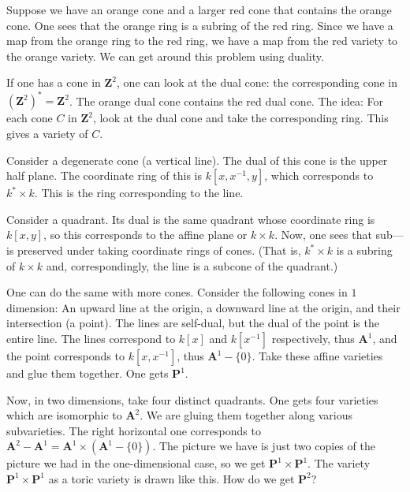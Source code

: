 \documentclass[11pt, oneside,margin=1in]{article}
\begin{document}
\begin{example}
Suppose we have an orange cone and a larger red cone that contains the orange cone. One sees that the orange ring is a subring of the red ring. Since we have a map from the orange ring to the red ring, we have a map from the red variety to the orange variety. We can get around this problem using duality. 

If one has a cone in $\mathbf{Z}^2$, one can look at the dual cone: the corresponding cone in $(\mathbf{Z}^2)^*=\mathbf{Z}^2$. The orange dual cone contains the red dual cone. The idea: For each cone $C$ in $\mathbf{Z}^2$, look at the dual cone and take the corresponding ring. This gives a variety of $C$.

Consider a degenerate cone (a vertical line). The dual of this cone is the upper half plane. The coordinate ring of this is $k[x,x^{-1},y]$, which corresponds to $k^*\times k$. This is the ring corresponding to the line.

Consider a quadrant. Its dual is the same quadrant whose coordinate ring is $k[x,y]$, so this corresponds to the affine plane or $k\times k$. Now, one sees that sub--- is preserved under taking coordinate rings of cones. (That is, $k^*\times k$ is a subring of $k\times k$ and, correspondingly, the line is a subcone of the quadrant.)
\end{example}

		One can do the same with more cones. Consider the following cones in $1$ dimension: An upward line at the origin, a downward line at the origin, and their intersection (a point). The lines are self-dual, but the dual of the point is the entire line. The lines correspond to $k[x]$ and $k[x^{-1}]$ respectively, thus $\mathbf{A}^1$, and the point corresponds to $k[x,x^{-1}]$, thus $\mathbf{A}^1 - \{0\}$. Take these affine varieties and glue them together. One gets $\mathbf{P}^1$. 


Now, in two dimensions, take four distinct quadrants. One gets four varieties which are isomorphic to $\mathbf{A}^2$. We are gluing them together along various subvarieties. The right horizontal one corresponds to $\mathbf{A}^2 - \mathbf{A}^1 = \mathbf{A}^1 \times (\mathbf{A}^1 - \{0\})$. The picture we have is just two copies of the picture we had in the one-dimensional case, so we get $\mathbf{P}^1\times \mathbf{P}^1$. The variety $\mathbf{P}^1 \times \mathbf{P}^1$ as a toric variety is drawn like this. How do we get $\mathbf{P}^2$?
\end{document}
